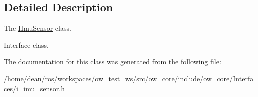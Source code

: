 \subsection{Detailed Description}
The \hyperlink{classow__core_1_1IImuSensor}{I\+Imu\+Sensor} class. 

Interface class. 

The documentation for this class was generated from the following file\+:\begin{DoxyCompactItemize}
\item 
/home/dean/ros/workspaces/ow\+\_\+test\+\_\+ws/src/ow\+\_\+core/include/ow\+\_\+core/\+Interfaces/\hyperlink{i__imu__sensor_8h}{i\+\_\+imu\+\_\+sensor.\+h}\end{DoxyCompactItemize}
